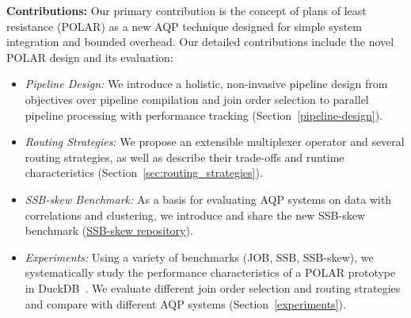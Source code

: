 \textbf{Contributions:} Our primary contribution is the concept of plans of least resistance (POLAR) as a new AQP technique designed for simple system integration and bounded overhead. Our detailed contributions include the novel POLAR design and its evaluation:
\begin{itemize}
    \item \emph{Pipeline Design:} We introduce a holistic, non-invasive pipe\-line design from objectives over pipeline compilation and join order selection to parallel pipeline processing with performance tracking (Section~\ref{pipeline-design}).
    \item \emph{Routing Strategies:} We propose an extensible multiplexer operator and several routing strategies, as well as describe their trade-offs and runtime characteristics (Section~\ref{sec:routing_strategies}).
		\item \emph{SSB-skew Benchmark:} As a basis for evaluating AQP systems on data with correlations and clustering, we introduce and share the new SSB-skew benchmark (\href{https://github.com/d-justen/duckdb-polr/tree/master/benchmark/ssb-skew}{SSB-skew repository}).
    \item \emph{Experiments:} Using a variety of benchmarks (JOB, SSB, SSB-skew), we systematically study the performance characteristics of a POLAR prototype in DuckDB~\cite{RaasveldtM19}. We evaluate different join order selection and routing strategies and compare with different AQP systems (Section~\ref{experiments}).
\end{itemize}
